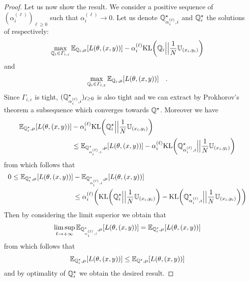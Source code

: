 \begin{proof}
Let us now show the result. We consider a positive sequence of $(\alpha_i^{(\ell)})_{\ell\geq0}$ such that $\alpha_i^{(\ell)}\to 0$.
Let us denote $\mathbb{Q}^{\star}_{\alpha_i^{(\ell)},i}$ and $\mathbb{Q}^{\star}_i$ the solutions of  respectively:
$$\max_{\QQ_i\in\Gamma_{i,\varepsilon}}\mathbb{E}_{\QQ_i,\mu}\left[\loss(\theta,(x,y))\right]-\alpha_i^{(\ell)}\text{KL}\left(\QQ_i\Big|\Big|\frac{1}{\numsamples}\mathbb{U}_{(x_i,y_i)}\right)$$
and 
$$\max_{\QQ_i\in\Gamma_{i,\varepsilon}}\mathbb{E}_{\QQ_i,\mu}\left[\loss(\theta,(x,y))\right]\quad.$$  Since $\Gamma_{i,\varepsilon}$ is tight, $(\mathbb{Q}^{\star}_{\alpha_i^{(\ell)},i})_{\ell\geq 0}$ is also tight and we can extract by Prokhorov's theorem a subsequence which converges towards $\mathbb{Q}^{\star}$. Moreover we have
\begin{align*}
 \mathbb{E}_{\QQ^{\star}_i,\mu}\left[\loss(\theta,(x,y))\right] &-\alpha_i^{(\ell)}\text{KL}\left(\QQ^{\star}_i\Big|\Big|\frac{1}{\numsamples}\mathbb{U}_{(x_i,y_i)}\right)\\
 &\leq \mathbb{E}_{\QQ^{\star}_{\alpha_i^{(\ell)},i},\mu}\left[\loss(\theta,(x,y))\right] -\alpha_i^{(\ell)}\text{KL}\left(\QQ^{\star}_{\alpha_i^{(\ell)},i}\Big|\Big|\frac{1}{\numsamples}\mathbb{U}_{(x_i,y_i)}\right)
\end{align*}
from which follows that
\begin{align*}
0\leq \mathbb{E}_{\QQ^{\star}_i,\mu}\left[\loss(\theta,(x,y))\right] &-  \mathbb{E}_{\QQ^{\star}_{\alpha_i^{(\ell)},i},\mu}\left[\loss(\theta,(x,y))\right]\\
&\leq \alpha_i^{(\ell)}\left(\text{KL}\left(\QQ^{\star}_i\Big|\Big|\frac{1}{\numsamples}\mathbb{U}_{(x_i,y_i)}\right)- \text{KL}\left(\QQ^{\star}_{\alpha_i^{(\ell)},i}\Big|\Big|\frac{1}{\numsamples}\mathbb{U}_{(x_i,y_i)}\right)\right)
\end{align*}
Then by considering the limit superior we obtain that
\begin{align*}
    \limsup_{\ell\to+\infty}\mathbb{E}_{\QQ^{\star}_{\alpha_i^{(\ell)},i},\mu}\left[\loss(\theta,(x,y))\right] = \mathbb{E}_{\QQ^{\star}_i,\mu}\left[\loss(\theta,(x,y))\right]
\end{align*}
from which follows that 
\begin{align*}
 \mathbb{E}_{\QQ^{\star}_i,\mu}\left[\loss(\theta,(x,y))\right]\leq \mathbb{E}_{\QQ^{\star},\mu}\left[\loss(\theta,(x,y))\right]
\end{align*}
and by optimality of $\mathbb{Q}^{\star}_i$ we obtain the desired result. 
\end{proof}




